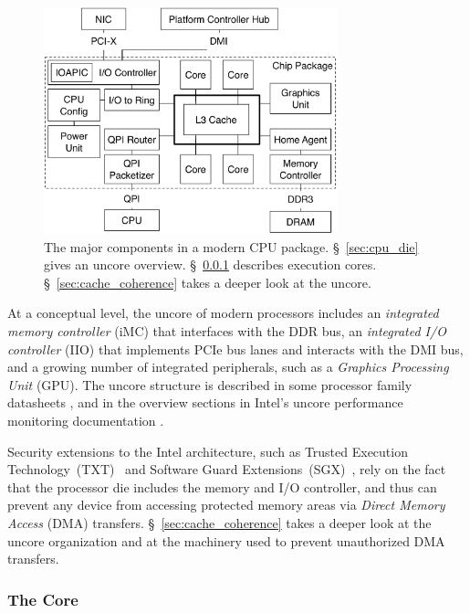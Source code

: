 \begin{figure}[hbt]
  \centering
  \includegraphics[width=85mm]{figures/cpu_die.pdf}
  \caption{
    The major components in a modern CPU package. \S~\ref{sec:cpu_die} gives
    an uncore overview. \S~\ref{sec:cpu_core} describes execution cores.
    \S~\ref{sec:cache_coherence} takes a deeper look at the uncore.
  }
  \label{fig:cpu_die}
\end{figure}


At a conceptual level, the uncore of modern processors includes an
\textit{integrated memory controller} (iMC) that interfaces with the DDR bus,
an \textit{integrated I/O controller} (IIO) that implements PCIe bus lanes and
interacts with the DMI bus, and a growing number of integrated peripherals,
such as a \textit{Graphics Processing Unit} (GPU). The uncore structure is
described in some processor family datasheets \cite{intel2014datasheet,
intel2010datasheet}, and in the overview sections in Intel's uncore performance
monitoring documentation \cite{intel2014uncore, intel2012uncore,
intel2010uncore}.

Security extensions to the Intel architecture, such as Trusted Execution
Technology~(TXT)~\cite{grawrock2009txt} and Software Guard
Extensions~(SGX)~\cite{mckeen2013sgx, anati2013sgx}, rely on the fact that the
processor die includes the memory and I/O controller, and thus can prevent any
device from accessing protected memory areas via \textit{Direct Memory Access}
(DMA) transfers. \S~\ref{sec:cache_coherence} takes a deeper look at the uncore
organization and at the machinery used to prevent unauthorized DMA transfers.


\subsubsection{The Core}
\label{sec:cpu_core}

